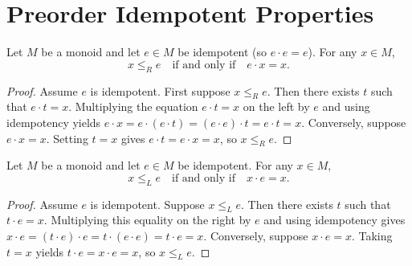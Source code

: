 \section{Preorder Idempotent Properties}

\begin{lemma}
\label{lem:RRel-idempotent_iff}
Let \(M\) be a monoid and let \(e\in M\) be idempotent (so \(e \cdot e = e\)).  For any \(x\in M\),
\[
  x \le_R e \quad\text{if and only if}\quad e\cdot x = x.
\]
\leanok
{}
\end{lemma}
\begin{proof}
\leanok
Assume \(e\) is idempotent.  First suppose \(x \le_R e\).  Then there exists \(t\) such that \(e \cdot t = x\).  Multiplying the equation \(e \cdot t = x\) on the left by \(e\) and using idempotency yields
\(e \cdot x = e \cdot (e \cdot t) = (e \cdot e) \cdot t = e \cdot t = x\).  Conversely, suppose \(e \cdot x = x\).  Setting \(t=x\) gives \(e \cdot t = e \cdot x = x\), so \(x \le_R e\).
\end{proof}

\begin{lemma}
\label{lem:LRel-idempotent_iff}
Let \(M\) be a monoid and let \(e\in M\) be idempotent.  For any \(x\in M\),
\[
  x \le_L e \quad\text{if and only if}\quad x\cdot e = x.
\]
\leanok
{}
\end{lemma}
\begin{proof}
\leanok
Assume \(e\) is idempotent.  Suppose \(x \le_L e\).  Then there exists \(t\) such that \(t \cdot e = x\).  Multiplying this equality on the right by \(e\) and using idempotency gives \(x \cdot e = (t \cdot e) \cdot e = t \cdot (e \cdot e) = t \cdot e = x\).  Conversely, suppose \(x \cdot e = x\).  Taking \(t = x\) yields \(t \cdot e = x\cdot e = x\), so \(x \le_L e\).
\end{proof}
